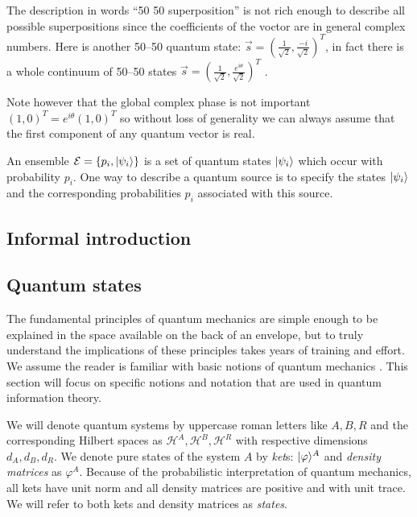 \documentclass[aps,11pt,twoside,letterpaper]{article}
\def\ph{\varphi}
\def\E{\mathcal{E}}
\def\cH{\mathcal{H}}
\begin{document}
        The description in words ``50 50 superposition'' is not rich enough to describe all possible superpositions since
        the coefficients of the voctor are in general complex numbers. 
        Here is another 50--50 quantum state: $\vec{s} = (\frac{1}{\sqrt{2}}, \frac{-i}{\sqrt{2}})^T$, in fact there is a
        whole continuum of 50--50  states $\vec{s} = (\frac{1}{\sqrt{2}}, \frac{e^{i\theta}}{\sqrt{2}})^T$ .

        Note however that the global complex phase is not important $(1,0)^T= e^{i\theta}(1,0)^T$ so without loss
        of generality we can always assume that the first component of any quantum vector is real.


        An ensemble $\E=\{p_i, \ket{\psi_i} \}$ is a set of quantum states $| \psi_i \rangle$ which occur with 
        probability $p_i$. 
        One way to describe a quantum source is to specify the states $| \psi_i \rangle$ and the
        corresponding probabilities $p_i$ associated with this source. 


    \subsection{Informal introduction}

		

		\bigskip
		\subsection{Quantum states}
			
			The fundamental principles of quantum mechanics are simple enough to be explained in the space
			available on the back of an envelope, but to truly understand the implications of these
			principles takes years of training and effort.
			We assume the reader is familiar with basic notions of quantum mechanics \cite{sakurai,NC04}. 
			This section will focus on specific notions and notation that are used in quantum information theory.
			
			We will denote quantum systems by uppercase roman letters like $A,B,R$ and the corresponding 
			Hilbert spaces as $\cH^A, \cH^B, \cH^R$ with respective dimensions $d_A,d_B,d_R$.
		    We denote pure states of the system $A$ by \emph{ket}s: $\ket{\ph}^A$
		    and \emph{density matrices} as $\ph^A$.		%
			Because of the probabilistic interpretation of quantum mechanics, all kets have unit norm and all
			density matrices are positive and with unit trace.
		    We will refer to both kets and density matrices as \emph{states}.
		    
\end{document}
